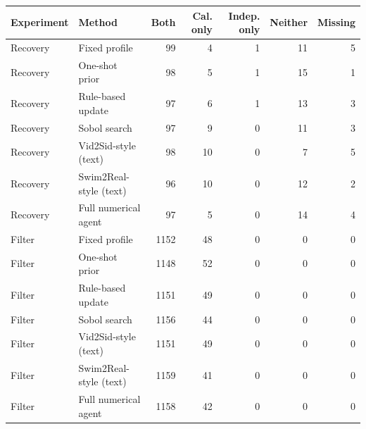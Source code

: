 \begin{tabular}{llrrrrr}
\toprule
Experiment & Method & Both & Cal. only & Indep. only & Neither & Missing \\
\midrule
Recovery & Fixed profile & 99 & 4 & 1 & 11 & 5 \\
Recovery & One-shot prior & 98 & 5 & 1 & 15 & 1 \\
Recovery & Rule-based update & 97 & 6 & 1 & 13 & 3 \\
Recovery & Sobol search & 97 & 9 & 0 & 11 & 3 \\
Recovery & Vid2Sid-style (text) & 98 & 10 & 0 & 7 & 5 \\
Recovery & Swim2Real-style (text) & 96 & 10 & 0 & 12 & 2 \\
Recovery & Full numerical agent & 97 & 5 & 0 & 14 & 4 \\
Filter & Fixed profile & 1152 & 48 & 0 & 0 & 0 \\
Filter & One-shot prior & 1148 & 52 & 0 & 0 & 0 \\
Filter & Rule-based update & 1151 & 49 & 0 & 0 & 0 \\
Filter & Sobol search & 1156 & 44 & 0 & 0 & 0 \\
Filter & Vid2Sid-style (text) & 1151 & 49 & 0 & 0 & 0 \\
Filter & Swim2Real-style (text) & 1159 & 41 & 0 & 0 & 0 \\
Filter & Full numerical agent & 1158 & 42 & 0 & 0 & 0 \\
\bottomrule
\end{tabular}
